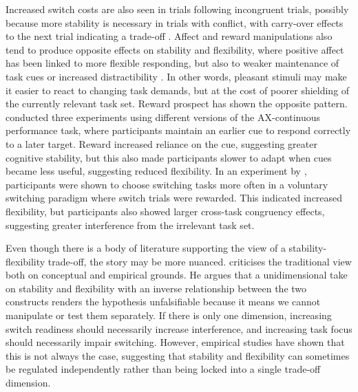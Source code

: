 \documentclass[12pt,a4paper]{report}
\begin{document}
Increased switch costs are also seen in trials following incongruent trials, possibly because more stability is necessary in trials with conflict, with carry-over effects to the next trial indicating a trade-off \parencite{botvinick2001conflict, goschke2000intentional, kiesel2010review}. Affect and reward manipulations also tend to produce opposite effects on stability and flexibility, where positive affect has been linked to more flexible responding, but also to weaker maintenance of task cues or increased distractibility \parencite{dreisbach2004positive, goschke2014emotional}. In other words, pleasant stimuli may make it easier to react to changing task demands, but at the cost of poorer shielding of the currently relevant task set. Reward prospect has shown the opposite pattern. \textcite{hefer2017reward} conducted three experiments using different versions of the AX-continuous performance task, where participants maintain an earlier cue to respond correctly to a later target. Reward increased reliance on the cue, suggesting greater cognitive stability, but this also made participants slower to adapt when cues became less useful, suggesting reduced flexibility. In an experiment by \textcite{braem2017conditioning}, participants were shown to choose switching tasks more often in a voluntary switching paradigm where switch trials were rewarded. This indicated increased flexibility, but participants also showed larger cross-task congruency effects, suggesting greater interference from the irrelevant task set.

Even though there is a body of literature supporting the view of a stability-flexibility trade-off, the story may be more nuanced. \textcite{egner2023principles} criticises the traditional view both on conceptual and empirical grounds. He argues that a unidimensional take on stability and flexibility with an inverse relationship between the two constructs renders the hypothesis unfalsifiable because it means we cannot manipulate or test them separately. If there is only one dimension, increasing switch readiness should necessarily increase interference, and increasing task focus should necessarily impair switching. However, empirical studies have shown that this is not always the case, suggesting that stability and flexibility can sometimes be regulated independently rather than being locked into a single trade-off dimension. 
\end{document}
